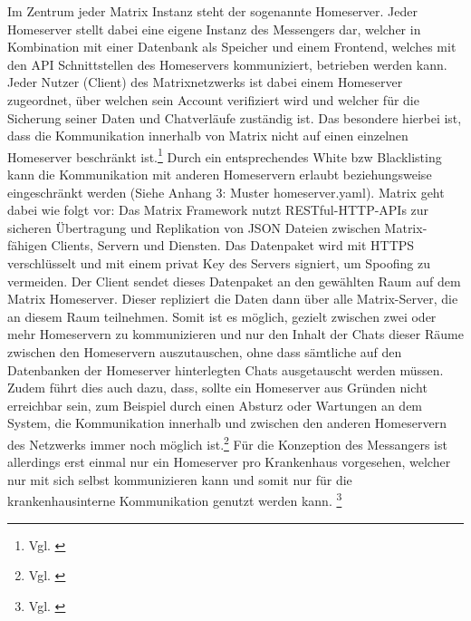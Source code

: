 Im Zentrum jeder Matrix Instanz steht der sogenannte Homeserver. Jeder Homeserver stellt dabei eine eigene Instanz des Messengers dar, welcher in Kombination mit einer Datenbank als Speicher und einem Frontend, welches mit den API Schnittstellen des Homeservers kommuniziert, betrieben werden kann. Jeder Nutzer (Client) des Matrixnetzwerks ist dabei einem Homeserver zugeordnet, über welchen sein Account verifiziert wird und welcher für die Sicherung seiner Daten und Chatverläufe zuständig ist. Das besondere hierbei ist, dass die Kommunikation innerhalb von Matrix nicht auf einen einzelnen Homeserver beschränkt ist.\footnote{Vgl. \cite{Github2020}} Durch ein entsprechendes White bzw Blacklisting kann die Kommunikation mit anderen Homeservern erlaubt beziehungsweise eingeschränkt werden (Siehe Anhang 3: Muster homeserver.yaml). Matrix geht dabei wie folgt vor:
Das Matrix Framework nutzt RESTful-HTTP-APIs zur sicheren Übertragung und Replikation von JSON Dateien zwischen Matrix-fähigen Clients, Servern und Diensten. Das Datenpaket wird mit HTTPS verschlüsselt und mit einem privat Key des Servers signiert, um Spoofing zu vermeiden.
Der Client sendet dieses Datenpaket an den gewählten \glqq Raum\grqq{} auf dem Matrix Homeserver. Dieser repliziert die Daten dann über alle Matrix-Server, die an diesem \glqq Raum\grqq{} teilnehmen. Somit ist es möglich, gezielt zwischen zwei oder mehr Homeservern zu kommunizieren und nur den Inhalt der Chats dieser Räume zwischen den Homeservern auszutauschen, ohne dass sämtliche auf den Datenbanken der Homeserver hinterlegten Chats ausgetauscht werden müssen. Zudem führt dies auch dazu, dass, sollte ein Homeserver aus Gründen nicht erreichbar sein, zum Beispiel durch einen Absturz oder Wartungen an dem System, die Kommunikation innerhalb und zwischen den anderen Homeservern des Netzwerks immer noch möglich ist.\footnote{Vgl. \cite{Github2020}} Für die Konzeption des Messangers ist allerdings erst einmal nur ein Homeserver pro Krankenhaus vorgesehen, welcher nur mit sich selbst kommunizieren kann und somit nur für die krankenhausinterne Kommunikation genutzt werden kann. \footnote{Vgl. \cite{Matirx.org-specifications2020}}


